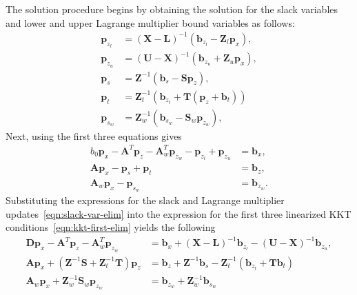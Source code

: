 \documentclass[12pt]{article}
\newcommand{\mb}{\mathbf}
\begin{document}
The solution procedure begins by obtaining the solution for the slack variables and lower and upper Lagrange multiplier bound variables as follows:
%
\begin{equation}
  \label{eqn:slack-var-elim}
  \begin{aligned}
    \mb{p}_{z_{l}} &= (\mb{X} - \mb{L})^{-1}(\mb{b}_{z_{l}} - \mb{Z}_{l} \mb{p}_{x} ), \\
    \mb{p}_{z_{u}} &= (\mb{U} - \mb{X})^{-1}(\mb{b}_{z_{u}} + \mb{Z}_{u} \mb{p}_{x} ), \\
    \mb{p}_{s} &= \mb{Z}^{-1}(\mb{b}_{s} - \mb{S}\mb{p}_{z}), \\
    \mb{p}_{t} &= \mb{Z}_{t}^{-1}(\mb{b}_{z_{t}} + \mb{T}(\mb{p}_{z} + \mb{b}_{t}))\\
    \mb{p}_{s_{w}} &= \mb{Z}_{w}^{-1}(\mb{b}_{s_{w}} - \mb{S}_{w} \mb{p}_{z_{w}}),
  \end{aligned}
\end{equation}
Next, using the first three equations gives
\begin{equation}
  \label{eqn:kkt-first-elim}
  \begin{aligned}
    b_{0} \mb{p}_{x} - \mb{A}^{T}\mb{p}_{z} - \mb{A}_{w}^{T}\mb{p}_{z_{w}} - \mb{p}_{z_{l}} + \mb{p}_{z_{u}} & = \mb{b}_{x}, \\
    \mb{A} \mb{p}_{x} - \mb{p}_{s} + \mb{p}_{t} &= \mb{b}_{z}, \\
    \mb{A}_{w} \mb{p}_{x} - \mb{p}_{s_{w}} & = \mb{b}_{z_{w}}.
  \end{aligned}
\end{equation}
Substituting the expressions for the slack and Lagrange multiplier updates~\eqref{eqn:slack-var-elim} into the expression for the first three linearized KKT conditions~\eqref{eqn:kkt-first-elim} yields the following
%
\begin{equation}
  \label{eqn:kkt-x-lagrange}
  \begin{aligned}
    \mb{D} \mb{p}_{x} - \mb{A}^{T}\mb{p}_{z} - \mb{A}_{w}^{T}\mb{p}_{z_{w}} &= 
    \mb{b}_{x} + (\mb{X} - \mb{L})^{-1}\mb{b}_{z_{l}} - (\mb{U} - \mb{X})^{-1}\mb{b}_{z_{u}}, \\
    \mb{A}\mb{p}_{x} + (\mb{Z}^{-1}\mb{S} + \mb{Z}_{t}^{-1}\mb{T}) \mb{p}_{z} &= \mb{b}_{z} + \mb{Z}^{-1}\mb{b}_{s} - \mb{Z}_{t}^{-1}(\mb{b}_{z_{t}} + \mb{T}\mb{b}_{t})\\
    \mb{A}_{w} \mb{p}_{x} + \mb{Z}_{w}^{-1}\mb{S}_{w} \mb{p}_{z_{w}} & = \mb{b}_{z_{w}} + \mb{Z}_{w}^{-1}\mb{b}_{s_{w}} \\
    \end{aligned}
\end{equation}
\end{document}
